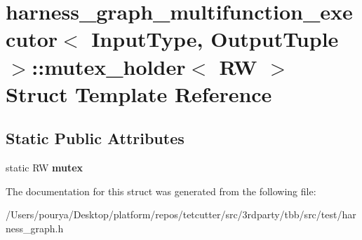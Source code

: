 \hypertarget{structharness__graph__multifunction__executor_1_1mutex__holder}{}\section{harness\+\_\+graph\+\_\+multifunction\+\_\+executor$<$ Input\+Type, Output\+Tuple $>$\+:\+:mutex\+\_\+holder$<$ R\+W $>$ Struct Template Reference}
\label{structharness__graph__multifunction__executor_1_1mutex__holder}
\subsection*{Static Public Attributes}
\begin{DoxyCompactItemize}
\item 
\hypertarget{structharness__graph__multifunction__executor_1_1mutex__holder_aca3a26701e1eae9804b2afe5d1272677}{}static R\+W {\bfseries mutex}\label{structharness__graph__multifunction__executor_1_1mutex__holder_aca3a26701e1eae9804b2afe5d1272677}

\end{DoxyCompactItemize}


The documentation for this struct was generated from the following file\+:\begin{DoxyCompactItemize}
\item 
/\+Users/pourya/\+Desktop/platform/repos/tetcutter/src/3rdparty/tbb/src/test/harness\+\_\+graph.\+h\end{DoxyCompactItemize}
